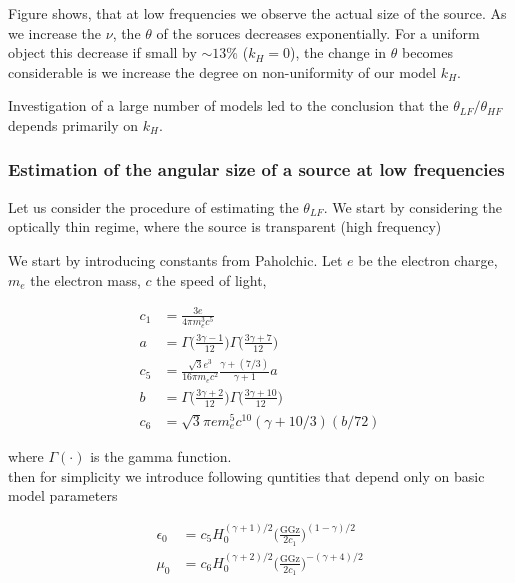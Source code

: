 \documentclass[11pt,a4paper,headinclude=true,DIV=14,BCOR=8mm,chapterprefix,listof=totoc,twoside,openright,abstracton]{scrbook}
\begin{document}
Figure shows, that at low frequencies we observe the actual size of the source. As we increase the $\nu$, the $\theta$ of the soruces decreases exponentially. For a uniform object this decrease if small by $\sim 13\%$ ($k_H=0$), the change in $\theta$ becomes considerable is we increase the degree on non-uniformity of our model $k_H$. 

Investigation of a large number of models led to the conclusion that the $\theta_{LF}/\theta_{HF}$ depends primarily on $k_H$. 

\subsubsection{Estimation of the angular size of a source at low frequencies}

Let us consider the procedure of estimating the $\theta_{LF}$. We start by considering the optically thin regime, where the source is transparent (high frequency)

We start by introducing constants from Paholchic. Let $e$ be the electron charge, $m_e$ the electron mass, $c$ the speed of light,

\begin{align}
    c_1 &= \frac{3 e}{4 \pi m_e ^3 c^5} \\
    a &= \Gamma\Big(\frac{3 \gamma - 1}{12}\Big) \Gamma\Big(\frac{3\gamma + 7}{12}\Big) \\
    c_5 &= \frac{\sqrt{3}e^3}{16\pi m_e c^2}\frac{\gamma + (7/3)}{\gamma + 1} a \\
    b &= \Gamma\Big(\frac{3\gamma + 2}{12}\Big)\Gamma\Big(\frac{3\gamma + 10}{12}\Big) \\
    c_6 &= \sqrt{3}\pi e m_e ^5 c^{10} (\gamma + 10/3) (b / 72) 
\end{align}

where $\Gamma(\cdot)$ is the gamma function. \\
then for simplicity we introduce following quntities that depend only on basic model parameters

\begin{align}
    \epsilon_0 &= c_5 H_{0}^{(\gamma + 1)/2} \Big(\frac{\text{GGz}}{2 c_1}\Big)^{(1-\gamma)/2} \\
    \mu_0 &= c_6 H_0^{(\gamma + 2)/2} \Big(\frac{\text{GGz}}{2 c_1}\Big)^{-(\gamma+4)/2}
\end{align}










\newpage


\end{document}
